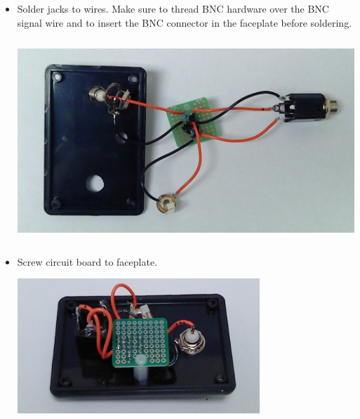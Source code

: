 \begin{itemize}
\item Solder jacks to wires. Make sure to thread BNC hardware over the BNC
signal wire and to insert the BNC connector in the faceplate before soldering.

\includegraphics[height=3in]
{photos/pump-box-20181112/board-conns.jpg}

\item Screw circuit board to faceplate.

\includegraphics[height=2in]
{photos/pump-box-20181030/board-done.jpg}
%
\end{itemize}

%
